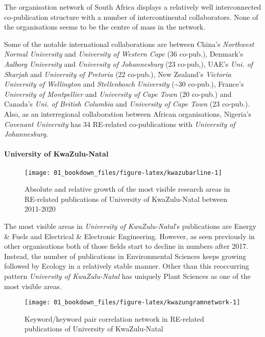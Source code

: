 \documentclass[12pt,twoside]{report}
\let\oldparagraph\paragraph
\renewcommand{\paragraph}[1]{\oldparagraph{#1}\mbox{}}
\begin{document}
The organisation network of South Africa displays a relatively well interconnected co-publication structure with a number of intercontinental collaborators. None of the organisations seems to be the centre of mass in the network.

Some of the notable international collaborations are between China's \emph{Northwest Normal University} and \emph{University of Western Cape} (36 co-pub.), Denmark's \emph{Aalborg University} and \emph{University of Johannesburg} (23 co-pub,), UAE's \emph{Uni. of Sharjah} and \emph{University of Pretoria} (22 co-pub.), New Zealand's \emph{Victoria University of Wellington} and \emph{Stellenbosch University} (\textasciitilde30 co-pub.), France's \emph{University of Montpellier} and \emph{University of Cape Town} (20 co-pub.) and Canada's \emph{Uni. of British Columbia} and \emph{University of Cape Town} (23 co-pub.). Also, as an interregional collaboration between African organisations, Nigeria's \emph{Covenant University} has 34 RE-related co-publications with \emph{University of Johannesburg}.

\hypertarget{university-of-kwazulu-natal}{%
\paragraph{University of KwaZulu-Natal}\label{university-of-kwazulu-natal}}

\begin{figure}
\texttt{[image: 01\_bookdown\_files/figure-latex/kwazubarline-1]} \caption{Absolute and relative growth of the most visible research areas in RE-related publications of University of KwaZulu-Natal between 2011-2020}\label{fig:kwazubarline}
\end{figure}

The most visible areas in \emph{University of KwaZulu-Natal}'s publications are Energy \& Fuels and Electrical \& Electronic Engineering. However, as seen previously in other organisations both of those fields start to decline in numbers after 2017. Instead, the number of publications in Environmental Sciences keeps growing followed by Ecology in a relatively stable manner. Other than this reoccurring pattern \emph{University of KwaZulu-Natal} has uniquely Plant Sciences as one of the most visible areas.

\begin{figure}
\texttt{[image: 01\_bookdown\_files/figure-latex/kwazungramnetwork-1]} \caption{Keyword/keyword pair correlation network in RE-related publications of University of KwaZulu-Natal}\label{fig:kwazungramnetwork}
\end{figure}
\end{document}
